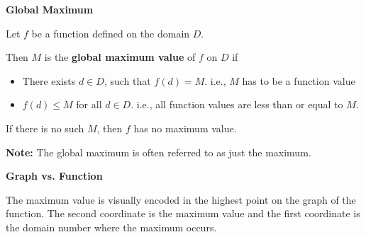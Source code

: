 \documentclass{ximera}
\begin{document}
\begin{definition} \textbf{\textcolor{green!50!black}{Global Maximum}} 


Let $f$ be a function defined on the domain $D$.

Then $M$ is the \textbf{global maximum value} of $f$ on $D$ if    


\begin{itemize}
\item There exists $d \in D$, such that $f(d) = M$.   i.e., $M$ has to be a function value 
\item $f(d) \leq M$ for all $d \in D$. i.e., all function values are less than or equal to $M$. 

\end{itemize}


If there is no such $M$, then $f$ has no maximum value.


\textbf{Note:} The global maximum is often referred to as just the maximum.

\end{definition}



\begin{observation} \textbf{\textcolor{-red!75}{Graph vs. Function}}

The maximum value is visually encoded in the highest point on the graph of the function.  The second coordinate is the maximum value and the first coordinate is the domain number where the maximum occurs.
\end{observation}
\end{document}
